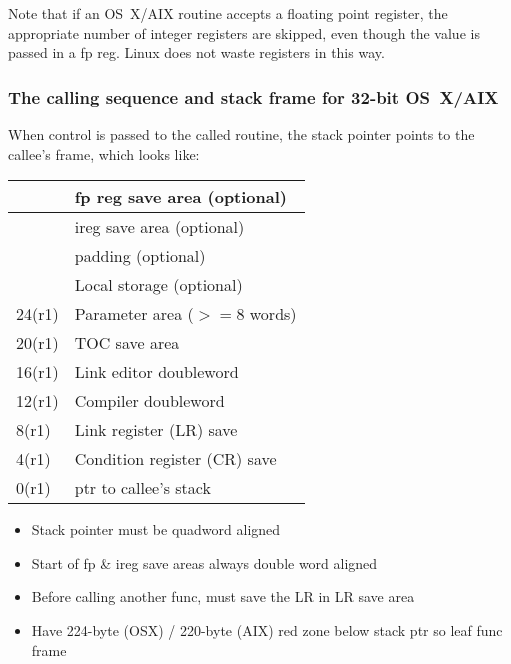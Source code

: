 \documentclass[11pt]{article}
\begin{document}
Note that if an OS~X/AIX routine accepts a floating point register, the
appropriate number of integer registers are skipped, even though the value
is passed in a fp reg.  Linux does not waste registers in this way.

\subsubsection{The calling sequence and stack frame for 32-bit OS~X/AIX}
When control is passed to the called routine, the stack pointer points to
the callee's frame, which looks like:
\begin{center}
\begin{tabular}{l|l}
       & fp reg save area (optional) \\\hline
       & ireg save area (optional) \\\hline
       & padding (optional) \\\hline
       & Local storage (optional) \\\hline
24(r1) & Parameter area ($>= 8$ words) \\\hline
20(r1) & TOC save area \\\hline
16(r1) & Link editor doubleword \\\hline
12(r1) & Compiler doubleword \\\hline
 8(r1) & Link register (LR) save \\\hline
 4(r1) & Condition register (CR) save \\\hline
 0(r1) & ptr to callee's stack \\\hline
\end{tabular}
\end{center}

\begin{itemize}
\item Stack pointer must be quadword aligned
\item Start of fp \& ireg save areas always double word aligned
\item Before calling another func, must save the LR in LR save area
\item Have 224-byte (OSX) / 220-byte (AIX) red zone below stack ptr so leaf func frame
\end{itemize}
\end{document}
